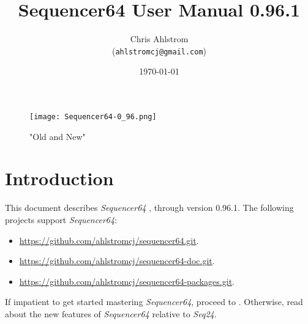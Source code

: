 \documentclass[
 11pt,
 twoside,
 a4paper,
 headinclude,
 footinclude,
 final                                 %
]{article}
\begin{document}
\title{Sequencer64 User Manual 0.96.1}
\author{Chris Ahlstrom \\
   (\texttt{ahlstromcj@gmail.com})}
\date{\today}
\maketitle

\begin{figure}[H]
   \centering 
   \texttt{[image: Sequencer64-0\_96.png]}
   \caption*{"Old and New"}
\end{figure}

\clearpage                             %

\tableofcontents
\listoffigures                         %
\listoftables                          %


\setlength{\parindent}{2em}
\setlength{\parskip}{1ex plus 0.5ex minus 0.2ex}

\section{Introduction}
\label{sec:introduction}

   This document describes \textsl{Sequencer64}
   \cite{sequencer64}, through version 0.96.1.
   The following projects support \textsl{Sequencer64}:

   \begin{itemize}
      \item \url{https://github.com/ahlstromcj/sequencer64.git}.
      \item \url{https://github.com/ahlstromcj/sequencer64-doc.git}.
      \item \url{https://github.com/ahlstromcj/sequencer64-packages.git}.
   \end{itemize}

   If impatient to get started mastering \textsl{Sequencer64},
   proceed to .
   Otherwise, read about the new features of \textsl{Sequencer64}
   relative to \textsl{Seq24}.
\end{document}
